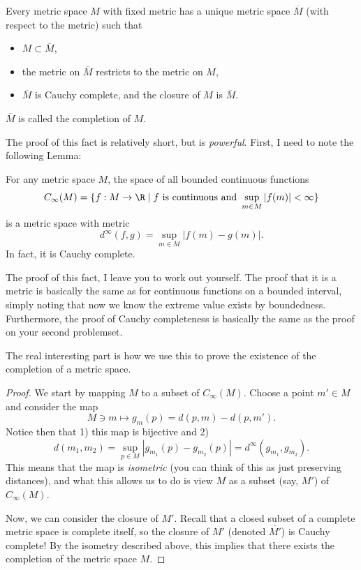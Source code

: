 \begin{theorem}
    Every metric space $M$ with fixed metric has a unique metric space $\overline{M}$ (with respect to the metric) such that 
    \begin{itemize}
        \item $M\subset \overline{M}$,
        \item the metric on $\overline{M}$ restricts to the metric on $M$,
        \item $\overline{M}$ is Cauchy complete, and the closure of $M$ is $\overline{M}$.
    \end{itemize}
    $\overline{M}$ is called the completion of $M$.
\end{theorem}

The proof of this fact is relatively short, but is \textit{powerful}. First, I need to note the following Lemma:
\begin{lemma}
For any metric space $M$, the space of all bounded continuous functions 
\[
C_\infty(M) = \{f: M\to \R \mid f \text{ is continuous and } \sup_{m\in M} |f(m)|<\infty\}
\]
is a metric space with metric 
\[
d^\infty(f,g) = \sup_{m\in M} |f(m) - g(m)|.
\] In fact, it is Cauchy complete.
\end{lemma}

The proof of this fact, I leave you to work out yourself. The proof that it is a metric is basically the same as for continuous functions on a bounded interval, simply noting that now we know the extreme value exists by boundedness. Furthermore, the proof of Cauchy completeness is basically the same as the proof on your second problemset.

The real interesting part is how we use this to prove the existence of the completion of a metric space.

\begin{proof}
We start by mapping $M$ to a subset of $C_\infty(M)$. Choose a point $m'\in M$ and consider the map
\[
M\ni m\mapsto g_m(p) = d(p,m) - d(p,m').
\]
Notice then that 1) this map is bijective and 2) 
\[
d(m_1, m_2) = \sup_{p\in M}|g_{m_1}(p) - g_{m_2} (p)| = d^\infty(g_{m_1}, g_{m_2}).
\]
This means that the map is \textit{isometric} (you can think of this as just preserving distances), and what this allows us to do is view $M$ as a subset (say, $M'$) of $C_\infty(M)$.

Now, we can consider the closure of $M'$. Recall that a closed subset of a complete metric space is complete itself, so the closure of $M'$ (denoted $\overline{M'}$) is Cauchy complete! By the isometry described above, this implies that there exists the completion of the metric space $M$.
\end{proof}

